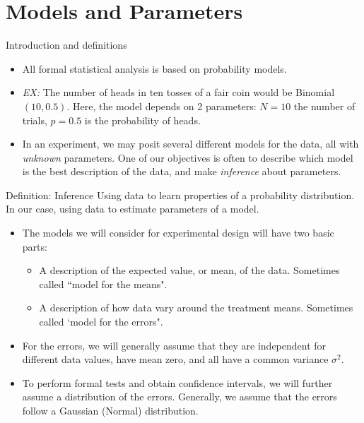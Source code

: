 \section{Models and Parameters}

\begin{frame}[allowframebreaks]{Introduction and definitions}
  \begin{itemize}
    \item All formal statistical analysis is based on probability models.
    \item \emph{EX:} The number of heads in ten tosses of a fair coin would be Binomial$(10, 0.5)$. Here, the model depends on 2 parameters: $N = 10$ the number of trials, $p = 0.5$ is the probability of heads.
    \item In an experiment, we may posit several different models for the data, all with \emph{unknown} parameters. 
    One of our objectives is often to describe which model is the best description of the data, and make \emph{inference} about parameters.
  \end{itemize}
  
  \begin{block}{Definition: Inference}
    Using data to learn properties of a probability distribution. In our case, using data to estimate parameters of a model.
  \end{block}
  
  \framebreak
  
  \begin{itemize}
    \item The models we will consider for experimental design will have two basic parts:
    \begin{itemize}
      \item A description of the expected value, or mean, of the data. Sometimes called ``model for the means".
      \item A description of how data vary around the treatment means. Sometimes called `model for the errors". 
    \end{itemize}
    \item For the errors, we will generally assume that they are independent for different data values, have mean zero, and all have a common variance $\sigma^2$.
    \item To perform formal tests and obtain confidence intervals, we will further assume a distribution of the errors.
    Generally, we assume that the errors follow a \alert{Gaussian} (Normal) distribution.
  \end{itemize}
  

\end{frame}
